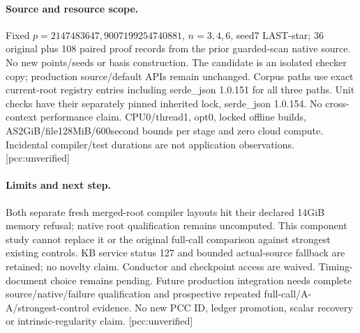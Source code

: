 \documentclass[10pt,a4paper]{article}
\begin{document}
\paragraph{Source and resource scope.} Fixed $p=2147483647,9007199254740881$,
$n=3,4,6$, seed7 LAST-star; 36 original plus 108 paired proof records from the prior
guarded-scan native source. No new points/seeds or basis construction. The
candidate is an isolated checker copy; production source/default APIs remain
unchanged. Corpus paths use exact current-root registry entries including
serde\_json 1.0.151 for all three paths. Unit checks have their separately pinned
inherited lock, serde\_json 1.0.154. No cross-context performance claim.
CPU0/thread1, opt0, locked offline builds, AS2GiB/file128MiB/600second bounds
per stage and zero cloud compute. Incidental compiler/test durations are not
application observations. [pcc:unverified]
\paragraph{Limits and next step.} Both separate fresh merged-root compiler
layouts hit their declared 14GiB memory refusal; native root qualification
remains uncomputed. This component study cannot replace it or the original
full-call comparison against strongest existing controls. KB service status 127
and bounded actual-source fallback are retained; no novelty claim. Conductor
and checkpoint access are waived. Timing-document choice remains pending.
Future production integration needs complete source/native/failure qualification
and prospective repeated full-call/A-A/strongest-control evidence. No new PCC
ID, ledger promotion, scalar recovery or intrinsic-regularity claim.
[pcc:unverified]
\end{document}
